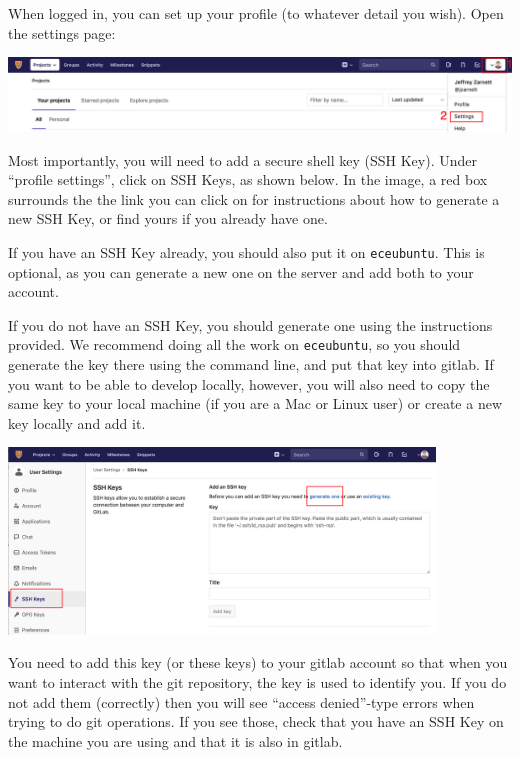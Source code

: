 When logged in, you can set up your profile (to whatever detail you wish). Open the settings page:

\begin{center}
	\includegraphics[width=\textwidth]{images/gitlab-profile.png}
\end{center}


Most importantly, you will need to add a secure shell key (SSH Key). Under ``profile settings'', click on SSH Keys, as shown below. In the image, a red box surrounds the the link you can click on for instructions about how to generate a new SSH Key, or find yours if you already have one. 
 
If you have an SSH Key already, you should also put it on \texttt{eceubuntu}. This is optional, as you can generate a new one on the server and add both to your account.
 
If you do not have an SSH Key, you should generate one using the instructions provided. We recommend doing all the work on \texttt{eceubuntu}, so you should generate the key there using the command line, and put that key into gitlab. If you want to be able to develop locally, however, you will also need to copy the same key to your local machine (if you are a Mac or Linux user) or create a new key locally and add it.

\begin{center}
	\includegraphics[width=0.85\textwidth]{images/gitlab-sshkey.png}
\end{center}

You need to add this key (or these keys) to your gitlab account so that when you want to interact with the git repository, the key is used to identify you. If you do not add them (correctly) then you will see ``access denied''-type errors when trying to do git operations. If you see those, check that you have an SSH Key on the machine you are using and that it is also in gitlab.


